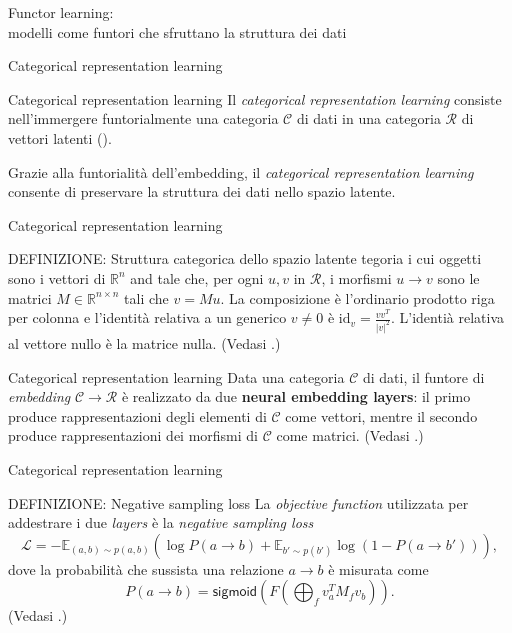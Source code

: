 \documentclass{beamer}
\begin{document}
\begin{frame}[standout]
    \huge Functor learning: \\\large modelli come funtori che sfruttano la struttura dei dati
\end{frame}

\begin{frame}{Categorical representation learning}
    \begin{block}{Categorical representation learning}
        Il \textit{categorical representation learning} consiste nell'immergere funtorialmente una categoria $\mathcal{C}$ di dati in una categoria $\mathcal{R}$ di vettori latenti (\cite{sheshmani2021categorical}). 
    \end{block}

    Grazie alla funtorialità dell'embedding, il \textit{categorical representation learning} consente di preservare la struttura dei dati nello spazio latente.
\end{frame}

\begin{frame}{Categorical representation learning}
    \begin{block}{DEFINIZIONE: Struttura categorica dello spazio latente}
        tegoria i cui oggetti sono i vettori di $\mathbb{R}^n$ and tale che, per ogni $u,v$ in $\mathcal{R}$, 
        i morfismi $u \to v$ sono le matrici $M \in \mathbb{R}^{n \times n}$ tali che $v = Mu$. La composizione è l'ordinario prodotto riga per colonna e l'identità relativa a un generico $v \neq 0$ è $\mathrm{id}_v = \frac{vv^T}{|v|^2}$. L'identià relativa al vettore nullo è la matrice nulla. (Vedasi \cite{sheshmani2021categorical}.)
    \end{block}
\end{frame}

\begin{frame}{Categorical representation learning}
    Data una categoria $\mathcal{C}$ di dati, il funtore di \textit{embedding} $\mathcal{C} \to \mathcal{R}$ è realizzato da due \textbf{neural embedding layers}: il primo produce rappresentazioni degli elementi di $\mathcal{C}$ come vettori, mentre il secondo produce rappresentazioni dei morfismi di $\mathcal{C}$ come matrici. (Vedasi \cite{sheshmani2021categorical}.)
\end{frame}

\begin{frame}{Categorical representation learning}

    \begin{block}{DEFINIZIONE: Negative sampling loss}
        La \textit{objective function} utilizzata per addestrare i due \textit{layers} è la \textit{negative sampling loss}
        \[\mathcal{L} = -\mathbb{E}_{(a,b) \sim p(a,b)}\left(\log P(a \to b) + \mathbb{E}_{b' \sim p(b')}\log (1-P(a \to b'))\right),\]
        dove la probabilità che sussista una relazione $a \to b$ è misurata come
        \[P(a \to b) = \mathsf{sigmoid}\left(F\left(\bigoplus_f v_a^TM_fv_b \right)\right).\]
        (Vedasi \cite{sheshmani2021categorical}.)
    \end{block}
    
\end{frame}
\end{document}
